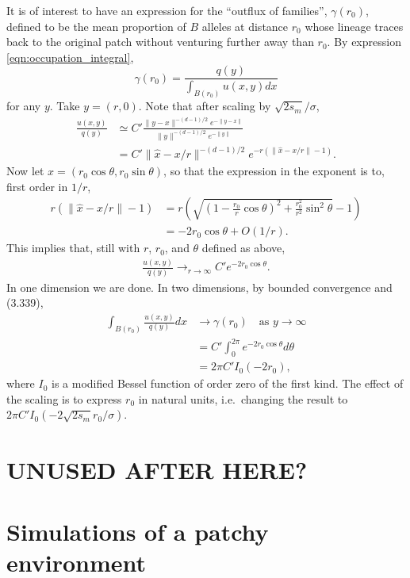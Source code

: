 \documentclass{article}
\begin{document}
It is of interest to have an expression for the ``outflux of families'',
$\gamma(r_0)$, 
defined to be the mean proportion of $B$ alleles at distance $r_0$
whose lineage traces back to the original patch without venturing further away than $r_0$.
By expression \eqref{eqn:occupation_integral},
\[
    \gamma(r_0) = \frac{q(y)}{\int_{B(r_0)} u(x,y) dx}
\]
for any $y$.  
Take $y=(r,0)$.
Note that after scaling by $\sqrt{2s_m}/\sigma$,
\begin{align}
    \frac{ u(x,y) }{ q(y) } &\simeq C' \frac{ \|y-x\|^{-(d-1)/2} e^{-\|y-x\|} }{ \|y\|^{-(d-1)/2} e^{-\|y\|} } \\
        &= C' \| \hat x - x/r \|^{-(d-1)/2} e^{-r (\|\hat x - x/r\| - 1)} .
\end{align}
Now let $x = (r_0 \cos \theta, r_0 \sin \theta)$,
so that the expression in the exponent is to, first order in $1/r$,
\begin{align}
    r (\|\hat x - x/r\| - 1) &= r \left( \sqrt{ \left( 1 - \frac{r_0}{r} \cos \theta \right)^2 + \frac{r_0^2}{r^2} \sin^2 \theta } - 1 \right ) \\
            &= - 2 r_0 \cos \theta + O(1/r) .
\end{align}
This implies that, still with $r$, $r_0$, and $\theta$ defined as above,
\begin{align}
    \frac{u(x,y)}{q(y)} \longrightarrow_{r \to \infty} C' e^{-2 r_0 \cos \theta} .
\end{align}
In one dimension we are done.
In two dimensions,
by bounded convergence and \citet{gradshteyn2007table} (3.339),
\begin{align}
  \int_{B(r_0)} \frac{u(x,y)}{q(y)} dx &\to \gamma(r_0) \quad \text{as } y \to \infty\\
            &= C' \int_0^{2 \pi} e^{-2 r_0 \cos \theta} d\theta \\
                         &= 2 \pi C' I_0(-2r_0),
\end{align}
where $I_0$ is a modified Bessel function of order zero of the first kind.
The effect of the scaling is to express $r_0$ in natural units, i.e.\ changing the result to $2 \pi C' I_0( - 2 \sqrt{2s_m} r_0 / \sigma ) $.

\section{UNUSED AFTER HERE?}

\section{Simulations of a patchy environment}
\label{apx:patchy_sims}
\end{document}
